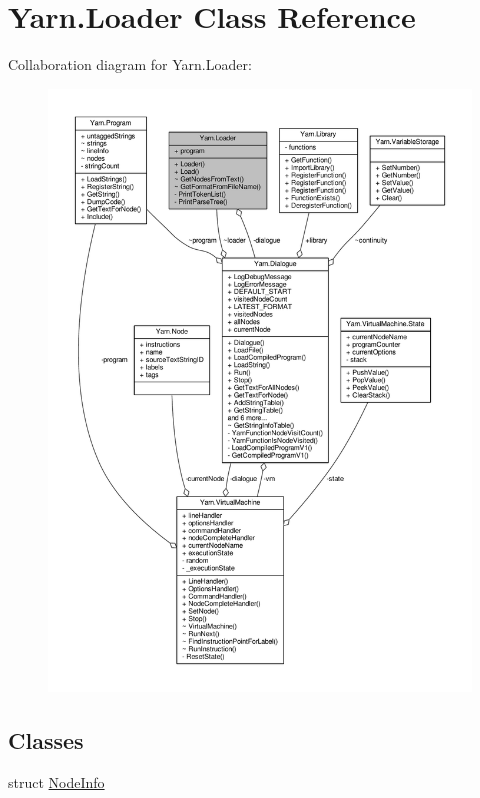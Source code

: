 \hypertarget{a00105}{\section{Yarn.\-Loader Class Reference}
\label{a00105}
}


Collaboration diagram for Yarn.\-Loader\-:
\nopagebreak
\begin{figure}[H]
\begin{center}
\leavevmode
\includegraphics[width=350pt]{dd/d5c/a00578}
\end{center}
\end{figure}
\subsection*{Classes}
\begin{DoxyCompactItemize}
\item 
struct \hyperlink{a00112}{Node\-Info}
\end{DoxyCompactItemize}
